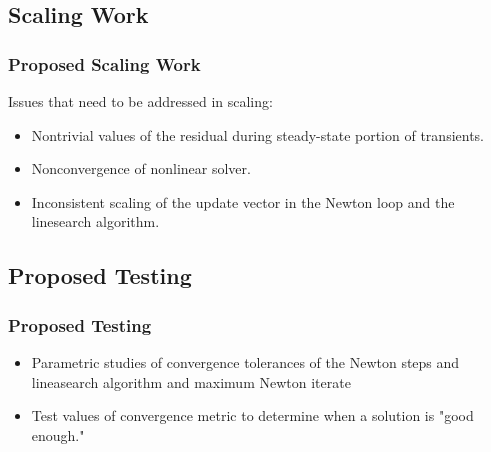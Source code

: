 \documentclass[compress,xcolor=table]{beamer}
\begin{document}
\subsection[Scaling]{Scaling Work}
\begin{frame}
\frametitle{Proposed Scaling Work}

Issues that need to be addressed in scaling:
\begin{itemize}
\item{Nontrivial values of the residual during steady-state portion of transients.}
\item{Nonconvergence of nonlinear solver.}
\item{Inconsistent scaling of the update vector in the Newton loop and the linesearch algorithm.} 
\end{itemize}

\end{frame}
\subsection[Testing]{Proposed Testing}
\begin{frame}
\frametitle{Proposed Testing}

\begin{itemize}
\item{Parametric studies of convergence tolerances of the Newton steps and lineasearch algorithm and maximum Newton iterate}
\item{Test values of convergence metric to determine when a solution is "good enough."}
\end{itemize}

\end{frame}
\end{document}
